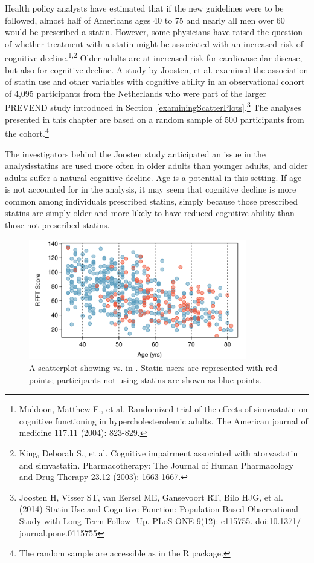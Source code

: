 Health policy analysts have estimated that if the new guidelines were to be followed, almost half of Americans ages 40 to 75 and nearly all men over 60 would be prescribed a statin. However, some physicians have raised the question of whether treatment with a statin might be associated with an increased risk of cognitive decline.\footnote{Muldoon, Matthew F., et al. Randomized trial of the effects of simvastatin on cognitive functioning in hypercholesterolemic adults. The American journal of medicine 117.11 (2004): 823-829.}\textsuperscript{,}\footnote{King, Deborah S., et al. Cognitive impairment associated with atorvastatin and simvastatin. Pharmacotherapy: The Journal of Human Pharmacology and Drug Therapy 23.12 (2003): 1663-1667.} Older adults are at increased risk for cardiovascular disease, but also for cognitive decline. A study by Joosten, et al. examined the association of statin use and other variables with cognitive ability in an observational cohort of 4,095 participants from the Netherlands who were part of the larger PREVEND study introduced in Section~\ref{examiningScatterPlots}.\footnote{Joosten H, Visser ST, van Eersel ME, Gansevoort RT, Bilo HJG, et al. (2014) Statin Use and Cognitive Function: Population-Based Observational Study with Long-Term Follow- Up. PLoS ONE 9(12): e115755. doi:10.1371/ journal.pone.0115755} The analyses presented in this chapter are based on a random sample of 500 participants from the cohort.\footnote{The random sample are accessible as  in the  \textsf{R} package.}

The investigators behind the Joosten study anticipated an issue in the analysis\textemdash statins are used more often in older adults than younger adults, and older adults suffer a natural cognitive decline. Age is a potential  in this setting. If age is not accounted for in the analysis, it may seem that cognitive decline is more common among individuals prescribed statins, simply because those prescribed statins are simply older and more likely to have reduced cognitive ability than those not prescribed statins.

\begin{figure}[t]
	\centering
	\includegraphics[width=0.85\textwidth]
	{ch_multiple_linear_regression_oi_biostat/figures/prevendAgeRFFTConfounderPlot/prevendAgeRFFTConfounderPlot}
	\caption{A scatterplot showing  vs.  in . Statin users are represented with red points; participants not using statins are shown as blue points.}
	\label{prevendAgeRFFTConfounderPlot}
\end{figure}


